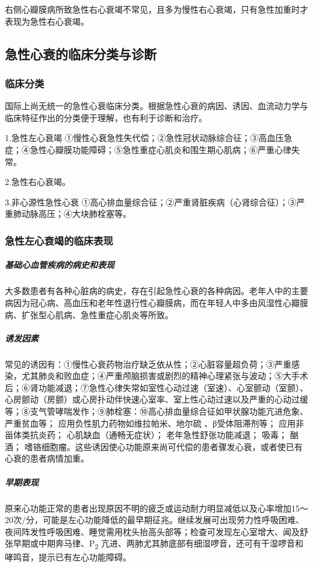 右侧心瓣膜病所致急性右心衰竭不常见，且多为慢性右心衰竭，只有急性加重时才表现为急性右心衰竭。

\subsection{急性心衰的临床分类与诊断}

\subsubsection{临床分类}

国际上尚无统一的急性心衰临床分类。根据急性心衰的病因、诱因、血流动力学与临床特征作出的分类便于理解，也有利于诊断和治疗。

1.急性左心衰竭
①慢性心衰急性失代偿；②急性冠状动脉综合征；③高血压急症；④急性心瓣膜功能障碍；⑤急性重症心肌炎和围生期心肌病；⑥严重心律失常。

2.急性右心衰竭。

3.非心源性急性心衰
①高心排血量综合征；②严重肾脏疾病（心肾综合征）；③严重肺动脉高压；④大块肺栓塞等。

\subsubsection{急性左心衰竭的临床表现}

\subparagraph{基础心血管疾病的病史和表现}

大多数患者有各种心脏病的病史，存在引起急性心衰的各种病因。老年人中的主要病因为冠心病、高血压和老年性退行性心瓣膜病，而在年轻人中多由风湿性心瓣膜病、扩张型心肌病、急性重症心肌炎等所致。

\subparagraph{诱发因素}

常见的诱因有：①慢性心衰药物治疗缺乏依从性；②心脏容量超负荷；③严重感染，尤其肺炎和败血症；④严重颅脑损害或剧烈的精神心理紧张与波动；⑤大手术后；⑥肾功能减退；⑦急性心律失常如室性心动过速（室速）、心室颤动（室颤）、心房颤动（房颤）或心房扑动伴快速心室率、室上性心动过速以及严重的心动过缓等；⑧支气管哮喘发作；⑨肺栓塞：⑩高心排血量综合征如甲状腺功能亢进危象、严重贫血等；{}
应用负性肌力药物如维拉帕米、地尔硫{} 、β受体阻滞剂等；{}
应用非甾体类抗炎药；{} 心肌缺血（通畅无症状）；{}
老年急性舒张功能减退；{} 吸毒；{} 酗酒；{}
嗜铬细胞瘤。这些诱因使心功能原来尚可代偿的患者骤发心衰，或者使已有心衰的患者病情加重。

\subparagraph{早期表现}

原来心功能正常的患者出现原因不明的疲乏或运动耐力明显减低以及心率增加15～20次/分，可能是左心功能降低的最早期征兆。继续发展可出现劳力性呼吸困难、夜间阵发性呼吸困难、睡觉需用枕头抬高头部等；检查可发现左心室增大、闻及舒张早期或中期奔马律、P\textsubscript{2}
亢进、两肺尤其肺底部有细湿啰音，还可有干湿啰音和哮鸣音，提示已有左心功能障碍。

